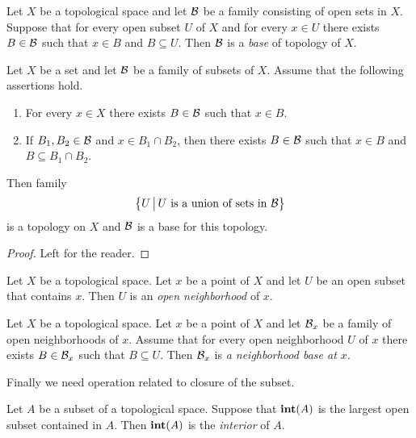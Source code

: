\begin{definition}
	Let $X$ be a topological space and let ${\mathcal B}$ be a family consisting of open sets in $X$. Suppose that for every open subset $U$ of $X$ and for every $x \in U$ there exists $B \in {\mathcal B}$ such that $x \in B$ and $B \subseteq U$. Then ${\mathcal B}$ is a \textit{base} of topology of $X$.
\end{definition}

\begin{fact}\label{fact:bases_of_topology}
	Let $X$ be a set and let ${\mathcal B}$ be a family of subsets of $X$. Assume that the following assertions hold.
	\begin{enumerate}[label=\emph{\textbf{(\arabic*)}}, leftmargin=3.0em]
		\item For every $x \in X$ there exists $B \in {\mathcal B}$ such that $x \in B$.
		\item If $B_1,B_2 \in {\mathcal B}$ and $x \in B_1 \cap B_2$, then there exists $B \in {\mathcal B}$ such that $x\in B$ and $B \subseteq B_1 \cap B_2$.
	\end{enumerate}
	Then family
	$$\big\{U\,\big|\,U\mbox{ is a union of sets in }{\mathcal B}\big\}$$
	is a topology on $X$ and ${\mathcal B}$ is a base for this topology.
\end{fact}
\begin{proof}
	Left for the reader.
\end{proof}

\begin{definition}
	Let $X$ be a topological space. Let $x$ be a point of $X$ and let $U$ be an open subset that contains $x$. Then $U$ is an \textit{open neighborhood} of $x$.
\end{definition}

\begin{definition}
	Let $X$ be a topological space. Let $x$ be a point of $X$ and let ${\mathcal B}_x$ be a family of open neighborhoods of $x$. Assume that for every open neighborhood $U$ of $x$ there exists $B \in {\mathcal B}_x$ such that $B\subseteq U$. Then ${\mathcal B}_x$ is \textit{a neighborhood base at $x$}.
\end{definition}
\noindent
Finally we need operation related to closure of the subset.

\begin{definition}
	Let $A$ be a subset of a topological space. Suppose that $\mathbf{int}(A)$ is the largest open subset contained in $A$. Then $\mathbf{int}(A)$ is the \textit{interior} of $A$.
\end{definition}


